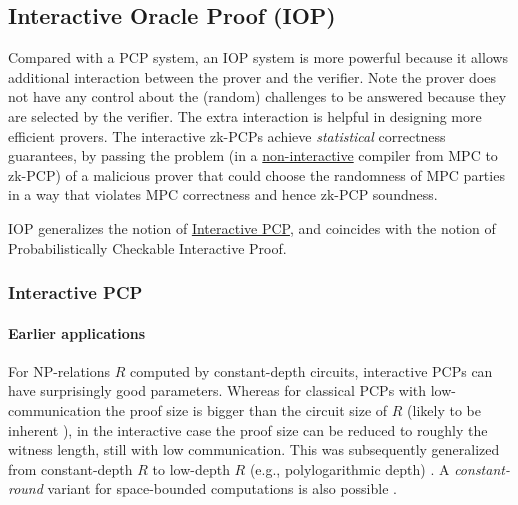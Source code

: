 \subsection{Interactive Oracle Proof (IOP)}
\label{paradigms:IT:IOP}

Compared with a PCP system, an IOP system is more powerful because it allows additional interaction between the prover and the verifier.
Note the prover does not have any control about the (random) challenges to be answered because they are selected by the verifier. 
The extra interaction is helpful in designing more efficient provers.
The interactive zk-PCPs achieve {\em statistical} correctness guarantees, by passing the problem (in a \underline{non-interactive} compiler from MPC to zk-PCP) of a malicious prover that could choose the randomness of MPC parties in a way that violates MPC correctness and hence zk-PCP soundness. 
\loosen

IOP generalizes the notion of \hyperref[paradigms:IT:IOP:interactive-PCP]{Interactive PCP}, and coincides with the notion of Probabilistically Checkable Interactive Proof. %




\subsubsection{Interactive PCP}
\label{paradigms:IT:IOP:interactive-PCP}

\vspace{.5em} 
\paragraph{Earlier applications}
For NP-relations $R$ computed by constant-depth circuits, interactive PCPs \cite{2008:icalp:interactive-PCP} can have surprisingly good parameters.
Whereas for classical PCPs with low-communication the proof size is bigger than the circuit size of $R$ (likely to be inherent \cite{2011:FORTNOW}), in the interactive case the proof size can be reduced to roughly the witness length, still with low communication. 
This was subsequently generalized from constant-depth $R$ to low-depth $R$ (e.g., polylogarithmic depth) \cite{2008:GKR}. 
A {\em constant-round} variant for space-bounded computations is also possible  \cite{2016:RRR:stoc:Constant-round-IP-for-Delegating-Computation}. 
\loosen


